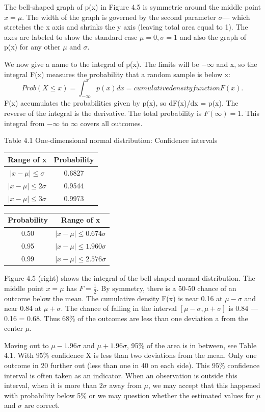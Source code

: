 The bell-shaped graph of p(x) in Figure 4.5 is symmetric around the middle point
$x=\mu$. The width of the graph is governed by the second parameter $\sigma$— which stretches
the x axis and shrinks the y axis (leaving total area equal to 1). The axes are labeled to
show the standard case $\mu=0,\sigma=1$ and also the graph of p(x) for any other $\mu$ and $\sigma$.

We now give a name to the integral of p(x). The limits will be $-\infty$ and x, so the
integral F(x) measures the probability that a random sample is below x:
\begin{equation}
Prob(X\leq x)=\int^x_{-\infty}p(x)dx=cumulative density function F(x).
\end{equation}
F(x) accumulates the probabilities given by p(x), so dF(x)/dx = p(x). The reverse of
the integral is the derivative. The total probability is $F(\infty)=1$. This integral from
$-\infty$ to $\infty$ covers all outcomes.
\begin{table}
	Table 4.1\; One-dimensional normal distribution: Confidence intervals
	\centering
	\begin{tabular}{c c}
		\hline 
		Range of x & Probability \\ 
		\hline 
		$|x-\mu|\leq \sigma$  & 0.6827 \\  
		$|x-\mu|\leq 2\sigma$ & 0.9544 \\ 
		$|x-\mu|\leq 3\sigma$ & 0.9973 \\ 
		\hline
	\end{tabular}
\qquad
	\begin{tabular}{c c}
	\hline 
	Probability & Range of x \\ 
	\hline 
	0.50 &   $|x-\mu|\leq 0.674\sigma$\\
	0.95 &   $|x-\mu|\leq 1.960\sigma$\\
	0.99 &   $|x-\mu|\leq 2.576\sigma$\\
	\hline 
	\end{tabular}  	
\end{table}

Figure 4.5\; (right) shows the integral of the bell-shaped normal distribution. The middle point $x=\mu$ has $F=\frac{1}{2}$. By symmetry, there is a 50-50 chance of an outcome below the mean. The cumulative density F(x) is near 0.16 at $\mu-\sigma$ and near 0.84 at $\mu+\sigma$. The chance of falling in the interval $[\mu-\sigma,\mu+\sigma ]$ is 0.84 — 0.16 = 0.68. Thus 68\% of the outcomes are less than one deviation a from the center $\mu$.

Moving out to $\mu-1.96\sigma$ and $\mu+1.96\sigma$, 95\% of the area is in between, see Table 4.1. With $95\%$ confidence X is less than two deviations from the mean. Only one outcome in 20 further out (less than one in 40 on each side). This $95\%$ confidence interval is often taken as an indicator. When an observation is outside this interval, when it is more than $2\sigma$ away from $\mu$, we may accept that this happened with probability below 5\% or we may question whether the estimated values for $\mu$ and $\sigma$ are correct. 


